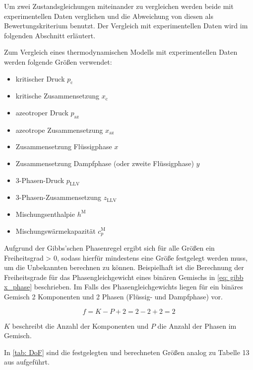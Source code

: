 \documentclass[../thesis.tex]{subfiles}
\begin{document}
Um zwei Zustandsgleichungen miteinander zu vergleichen werden beide mit experimentellen Daten verglichen und die Abweichung von diesen als Bewertungskriterium benutzt. Der Vergleich mit experimentellen Daten wird im folgenden Abschnitt erläutert.

Zum Vergleich eines thermodynamischen Modells mit experimentellen Daten werden folgende Größen verwendet:
\begin{itemize}
	\item kritischer Druck $ p_\mathrm{c} $
	\item kritische Zusammensetzung $ x_\mathrm{c} $
	\item azeotroper Druck $ p_\mathrm{az} $
	\item azeotrope Zusammensetzung $ x_\mathrm{az} $
	\item Zusammensetzung Flüssigphase $ x $
	\item Zusammensetzung Dampfphase (oder zweite Flüssigphase) $ y $
	\item 3-Phasen-Druck $p_{\mathrm{LLV}}$
	\item 3-Phasen-Zusammensetzung $z_{\mathrm{LLV}}$
	\item Mischungsenthalpie $h^{\mathrm{M}}$
	\item Mischungswärmekapazität $c_p^{\mathrm{M}}$
\end{itemize}

Aufgrund der Gibbs'schen Phasenregel ergibt sich für alle Größen ein Freiheitsgrad > 0, sodass hierfür mindestens eine Größe festgelegt werden muss, um die Unbekannten berechnen zu können. Beispielhaft ist die Berechnung der Freiheitsgrade für das Phasengleichgewicht eines binären Gemischs in \autoref{eq: gibb x_phase} beschrieben. Im Falls des Phasengleichgewichts liegen für ein binäres Gemisch 2 Komponenten und 2 Phasen (Flüssig- und Dampfphase) vor.

\begin{equation}
	\label{eq: gibb x_phase}
	f = K - P + 2 = 2 - 2 + 2 = 2
\end{equation}

$ K $ beschreibt die Anzahl der Komponenten und $ P $ die Anzahl der Phasen im Gemisch.

In \autoref{tab: DoF} sind die festgelegten und berechneten Größen analog zu Tabelle 13 aus \cite{jaubert2020benchmark} aufgeführt.
\end{document}
